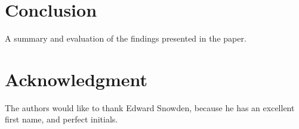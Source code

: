 \documentclass[12pt,journal,compsoc]{IEEEtran}
\begin{document}
\section{Conclusion}
A summary and evaluation of the findings presented in the paper.



\section*{Acknowledgment}
The authors would like to thank Edward Snowden, because he has an excellent
first name, and perfect initials.



%
%
%
\end{document}
